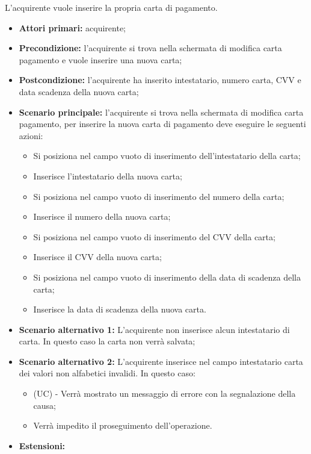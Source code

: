 L'acquirente vuole inserire la propria carta di pagamento.
\begin{itemize}
    \item \textbf{Attori primari:} acquirente;
    \item \textbf{Precondizione:} l'acquirente si trova nella schermata di modifica carta pagamento e vuole inserire una nuova carta;
    \item \textbf{Postcondizione:} l'acquirente ha inserito intestatario, numero carta, CVV e data scadenza della nuova carta;
    \item \textbf{Scenario principale:} l'acquirente si trova nella schermata di modifica carta pagamento, per inserire la nuova carta di pagamento deve eseguire le seguenti azioni:
        \begin{itemize}
            \item Si posiziona nel campo vuoto di inserimento dell'intestatario della carta;
            \item Inserisce l'intestatario della nuova carta;
            \item Si posiziona nel campo vuoto di inserimento del numero della carta;
            \item Inserisce il numero della nuova carta;
            \item Si posiziona nel campo vuoto di inserimento del CVV della carta;
            \item Inserisce il CVV della nuova carta;
            \item Si posiziona nel campo vuoto di inserimento della data di scadenza della carta;
            \item Inserisce la data di scadenza della nuova carta.
        \end{itemize}
    \item \textbf{Scenario alternativo 1:} L'acquirente non inserisce alcun intestatario di carta. In questo caso la carta non verrà salvata;
    \item \textbf{Scenario alternativo 2:} L'acquirente inserisce nel campo intestatario carta dei valori non alfabetici invalidi. In questo caso:
    \begin{itemize}
        \item (UC) - Verrà mostrato un messaggio di errore con la segnalazione della causa;
        \item Verrà impedito il proseguimento dell'operazione.
    \end{itemize}    
    \item \textbf{Estensioni:}

\end{itemize}
